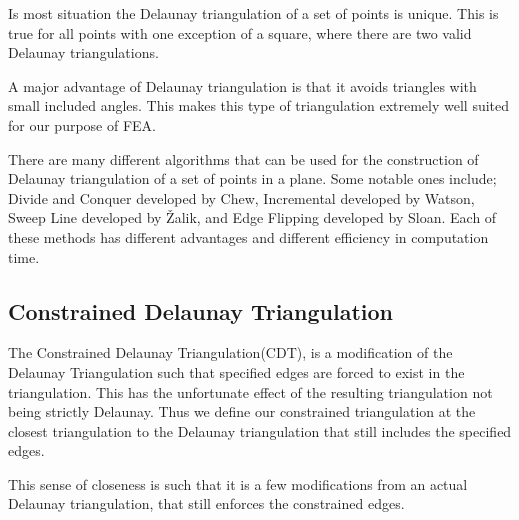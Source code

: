 \documentclass[../fem.tex]{subfiles}
\begin{document}
\begin{Figure}
   \begin{center}
     
   \end{center}
\end{Figure}

Is most situation the Delaunay triangulation of a set of points is unique. This
is true for all points with one exception of a square, where there are two
valid Delaunay triangulations.

A major advantage of Delaunay triangulation is that it avoids triangles with
small included angles. This makes this type of triangulation extremely well
suited for our purpose of FEA.

There are many different algorithms that can be used for the construction of
Delaunay triangulation of a set of points in a plane. Some notable ones
include; Divide and Conquer developed by Chew\cite{C_CDT}, Incremental
developed by Watson, Sweep Line developed by \v{Z}alik\cite{Z_DT}\cite{DZ_CDT},
and Edge Flipping developed by Sloan\cite{S_DT}\cite{S_CDT}. Each of these
methods has different advantages and different efficiency in computation time.

\subsection{Constrained Delaunay Triangulation}%
\label{sub:constrained_delaunay_triangulation}

The Constrained Delaunay Triangulation(CDT), is a modification of the Delaunay
Triangulation such that specified edges are forced to exist in the
triangulation. This has the unfortunate effect of the resulting triangulation
not being strictly Delaunay. Thus we define our constrained triangulation at
the closest triangulation to the Delaunay triangulation that still includes the
specified edges.

This sense of closeness is such that it is a few modifications from an actual
Delaunay triangulation, that still enforces the constrained edges.

\begin{Figure}
  \begin{center}
    
  \end{center}
\end{Figure}
\end{document}
